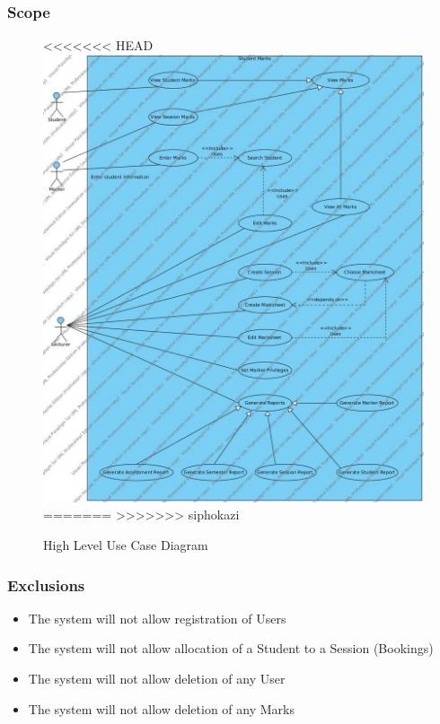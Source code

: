 \documentclass[a4paper]{article}
\begin{document}
			\subsubsection{Scope}
			\begin{figure}[h]
				\caption{High Level Use Case Diagram}
<<<<<<< HEAD
				\includegraphics[width=1\textwidth]{StudentMarks}
=======
>>>>>>> siphokazi
			\end{figure}
			\subsubsection{Exclusions}
				\begin{itemize}
				
					\item{The system will not allow registration of Users}
					
					\item{The system will not allow allocation of a Student to a Session (Bookings)}
					
					\item{The system will not allow deletion of any User}
					
					\item{The system will not allow deletion of any Marks}
				
				\end{itemize}
\end{document}
